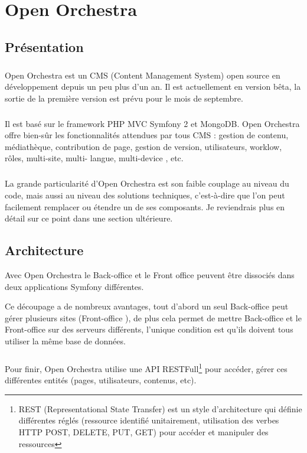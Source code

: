 \chapter{Open Orchestra}
\section{Présentation}
        \paragraph{}
        Open Orchestra est un CMS (Content Management  System) open source en développement depuis un peu plus d'un an. Il est actuellement en version bêta, la sortie de la première version est prévu pour le mois de septembre.
        \paragraph{}
        Il est basé sur le framework PHP MVC Symfony 2 et MongoDB. Open Orchestra offre bien-sûr les fonctionnalités attendues par tous CMS : gestion de contenu, médiathèque, contribution de page, gestion de version, utilisateurs, worklow, rôles,  multi-site, multi- langue,  multi-device , etc.
        \paragraph{}
        La grande particularité d'Open Orchestra est son faible couplage au niveau du code, mais aussi au niveau des solutions techniques, c'est-à-dire que l'on peut facilement remplacer ou étendre un de ses composants. Je reviendrais plus en détail sur ce point dans une section ultérieure.
        
        \section{Architecture}
       Avec Open Orchestra le \og Back-office \fg{} et le \og Front office \fg{} peuvent être dissociés dans deux applications Symfony différentes. 

        Ce découpage a de nombreux avantages, tout d'abord un seul \og Back-office \fg{}  peut gérer plusieurs sites (\og Front-office \fg{}), de plus cela permet de mettre \og Back-office \fg{} et le \og Front-office \fg{} sur des serveurs différents, l'unique condition est qu'ils doivent tous utiliser la même base de données.
        \paragraph{}
		Pour finir, Open Orchestra utilise une API RESTFull\footnote{REST (Representational State Transfer) est un style d'architecture qui définie différentes réglés (ressource identifié unitairement, utilisation des verbes HTTP POST, DELETE, PUT, GET) pour accéder et manipuler des ressources } pour  accéder, gérer ces différentes entités (pages, utilisateurs, contenus, etc).
